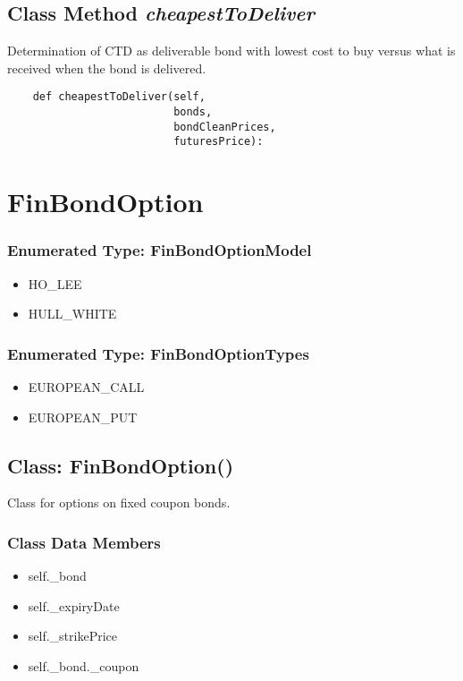 \documentclass[twoside,11pt]{book}
\begin{document}
\subsection{Class Method {\it cheapestToDeliver}}
Determination of CTD as deliverable bond with lowest cost to buy versus what is received when the bond is delivered. 

\begin{lstlisting}
    def cheapestToDeliver(self, 
                          bonds,
                          bondCleanPrices,
                          futuresPrice):
\end{lstlisting}

\newpage
\section{FinBondOption}

\subsubsection{Enumerated Type: FinBondOptionModel}
\begin{itemize}
\item{HO\_LEE}
\item{HULL\_WHITE}
\end{itemize}

\subsubsection{Enumerated Type: FinBondOptionTypes}
\begin{itemize}
\item{EUROPEAN\_CALL}
\item{EUROPEAN\_PUT}
\end{itemize}

\subsection{Class: FinBondOption()}
Class for options on fixed coupon bonds. 

\subsubsection{Class Data Members}
\begin{itemize}
\item{self.\_bond}
\item{self.\_expiryDate}
\item{self.\_strikePrice}
\item{self.\_bond.\_coupon}
\end{itemize}
\end{document}
